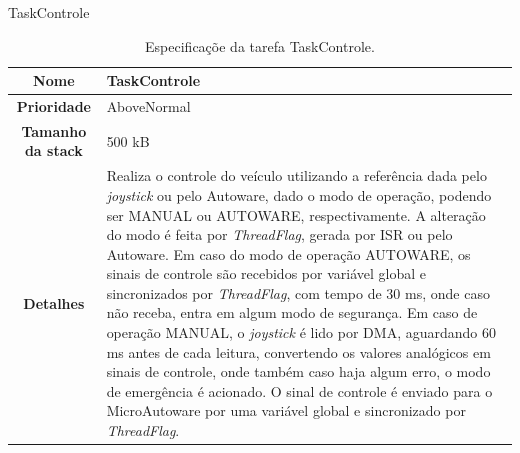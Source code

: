 \noindent TaskControle

\begin{table}[H]
	\centering
	\begin{tabular}{c|p{11.5cm}}
	\textbf{Nome} & TaskControle \\
	\hline
	\textbf{Prioridade}& AboveNormal \\
	\hline
	\textbf{Tamanho da stack} & 500 kB \\
	\hline
	\textbf{Detalhes} & Realiza o controle do veículo utilizando a referência dada pelo \textit{joystick} ou pelo Autoware, dado o modo de operação, podendo ser MANUAL ou AUTOWARE, respectivamente. A alteração do modo é feita por \textit{ThreadFlag}, gerada por ISR ou pelo Autoware. Em caso do modo de operação AUTOWARE, os sinais de controle são recebidos por variável global e sincronizados por \textit{ThreadFlag}, com tempo de 30 ms, onde caso não receba, entra em algum modo de segurança. Em caso de operação MANUAL,  o \textit{joystick} é lido por DMA, aguardando 60 ms antes de cada leitura,  convertendo os valores analógicos em sinais de controle, onde também caso haja algum erro, o modo de emergência é acionado. O sinal de controle é enviado para o MicroAutoware por uma variável global e sincronizado por \textit{ThreadFlag}. 
	\end{tabular}
	\caption{Especificaçõe da tarefa TaskControle.}
	\label{tab:taskcontrole}
\end{table}

